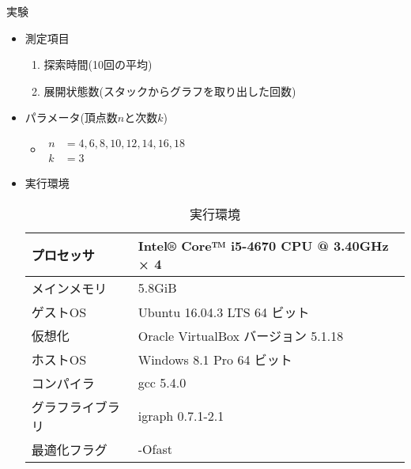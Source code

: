 \begin{frame}{実験}
  \begin{itemize}
  \item 測定項目
    \begin{enumerate}
    \item 探索時間(10回の平均)
    \item 展開状態数(スタックからグラフを取り出した回数)
    \end{enumerate}
  \item パラメータ(頂点数$n$と次数$k$)
    \begin{itemize}
    \item[]\par$\begin{aligned}
      n &= 4,6,8,10,12,14,16,18 \\
      k &= 3
    \end{aligned}$
    \end{itemize}
  \item 実行環境
    \par\begin{table}
    \scriptsize
    \caption{実行環境}
    \label{tab:env-lab}
    \centering
    \begin{tabular}{ll}
      \hline
      プロセッサ & Intel® Core™ i5-4670 CPU @ 3.40GHz × 4 \\ \hline
      メインメモリ & 5.8GiB \\ \hline
      ゲストOS & Ubuntu 16.04.3 LTS 64 ビット \\ \hline
      仮想化 & Oracle VirtualBox バージョン 5.1.18 \\ \hline
      ホストOS & Windows 8.1 Pro 64 ビット \\ \hline
      コンパイラ & gcc 5.4.0 \\ \hline
      グラフライブラリ & igraph 0.7.1-2.1 \\ \hline
      最適化フラグ & -Ofast \\ \hline
    \end{tabular}
    \end{table}
  \end{itemize}
\end{frame}

